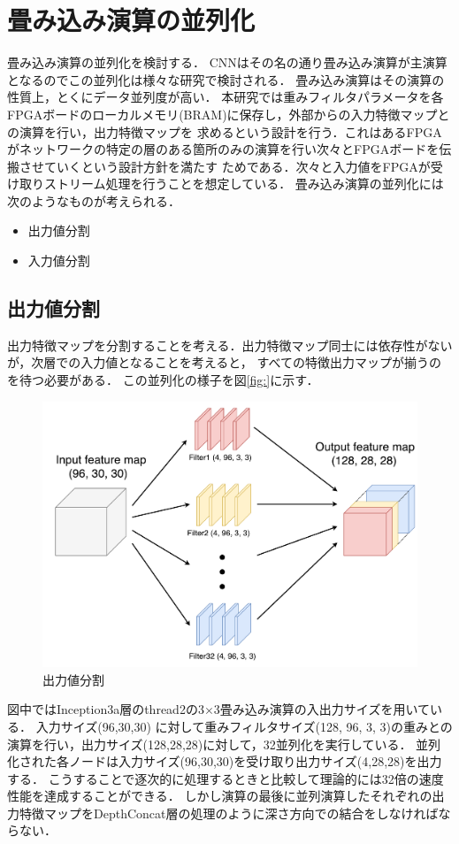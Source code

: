 {\section{畳み込み演算の並列化}
\label{sec:conv_para}
畳み込み演算の並列化を検討する．
CNNはその名の通り畳み込み演算が主演算となるのでこの並列化は様々な研究で検討される．
畳み込み演算はその演算の性質上，とくにデータ並列度が高い．
本研究では重みフィルタパラメータを各FPGAボードのローカルメモリ(BRAM)に保存し，外部からの入力特徴マップとの演算を行い，出力特徴マップを
求めるという設計を行う．これはあるFPGAがネットワークの特定の層のある箇所のみの演算を行い次々とFPGAボードを伝搬させていくという設計方針を満たす
ためである．次々と入力値をFPGAが受け取りストリーム処理を行うことを想定している．
畳み込み演算の並列化には次のようなものが考えられる．
\begin{itemize}
    \item 出力値分割
    \item 入力値分割
\end{itemize}
\subsection{出力値分割}
\label{subsec:para_output}
出力特徴マップを分割することを考える．出力特徴マップ同士には依存性がないが，次層での入力値となることを考えると，
すべての特徴出力マップが揃うのを待つ必要がある．
この並列化の様子を図\ref{fig:}に示す．
\begin{figure}[h]
    \centering
    \includegraphics[width=12cm]{./chap5/fig/conv_para_output.pdf}
    \caption{出力値分割}
    \label{fig:conv_para_output}
\end{figure}
図中ではInception3a層のthread2の3$\times$3畳み込み演算の入出力サイズを用いている．
入力サイズ(96,30,30) に対して重みフィルタサイズ(128, 96, 3, 3)の重みとの演算を行い，出力サイズ(128,28,28)に対して，32並列化を実行している．
並列化された各ノードは入力サイズ(96,30,30)を受け取り出力サイズ(4,28,28)を出力する．
こうすることで逐次的に処理するときと比較して理論的には32倍の速度性能を達成することができる．
しかし演算の最後に並列演算したそれぞれの出力特徴マップをDepthConcat層の処理のように深さ方向での結合をしなければならない．
}
